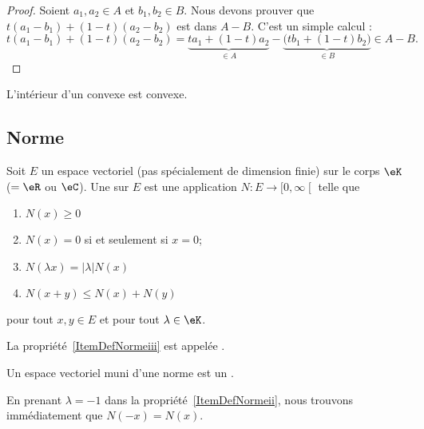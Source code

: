 \begin{proof}
	Soient \( a_1,a_2\in A\) et \( b_1,b_2\in B\). Nous devons prouver que \( t(a_1-b_1)+(1-t)(a_2-b_2)\) est dans \( A-B\). C'est un simple calcul :
	\begin{equation}
		t(a_1-b_1)+(1-t)(a_2-b_2)=\underbrace{ta_1+(1-t)a_2}_{\in A}-\underbrace{\big( tb_1+(1-t)b_2 \big)}_{\in B}\in A-B.
	\end{equation}
\end{proof}

\begin{lemma}		\label{LEMooEFCCooOuStrb}
	L'intérieur d'un convexe est convexe.
\end{lemma}

\ssdem

\subsection{Norme}

\begin{definition}  \label{DefNorme}
	Soit \( E\) un espace vectoriel (pas spécialement de dimension finie) sur le corps \( \eK\) (\( =\eR\) ou \( \eC\)). Une   sur \( E\) est une application \( N\colon E\to\mathopen[ 0 , \infty \mathclose[\) telle que
	\begin{enumerate}
		\item
		      \( N(x)\geq 0\)
		\item
		      \( N(x)=0\) si et seulement si \( x=0\);
		\item   \label{ItemDefNormeii}
		      \( N(\lambda x)=| \lambda |N(x)\)
		\item   \label{ItemDefNormeiii}
		      \( N(x+y)\leq N(x)+N(y)\)
	\end{enumerate}
	pour tout \( x,y\in E\) et pour tout \( \lambda\in\eK\).

	La propriété~\ref{ItemDefNormeiii} est appelée .

	Un espace vectoriel muni d'une norme est un .
\end{definition}
En prenant \( \lambda=-1\) dans la propriété~\ref{ItemDefNormeii}, nous trouvons immédiatement que \( N(-x)=N(x)\).

